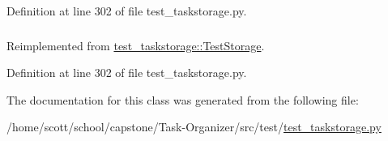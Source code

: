 \-Definition at line 302 of file test\-\_\-taskstorage.\-py.

\hypertarget{classtest__taskstorage_1_1TestGTaskStorage_abb748de83f5fdbc145f7570464fe13b7}{
\subsubsection[{task\-\_\-storage}]{}}
\label{classtest__taskstorage_1_1TestGTaskStorage_abb748de83f5fdbc145f7570464fe13b7}


\-Reimplemented from \hyperlink{classtest__taskstorage_1_1TestStorage_a414fec77c1f9ac66b58f26df514fc048}{test\-\_\-taskstorage\-::\-Test\-Storage}.



\-Definition at line 302 of file test\-\_\-taskstorage.\-py.



\-The documentation for this class was generated from the following file\-:\begin{DoxyCompactItemize}
\item 
/home/scott/school/capstone/\-Task-\/\-Organizer/src/test/\hyperlink{test__taskstorage_8py}{test\-\_\-taskstorage.\-py}\end{DoxyCompactItemize}
